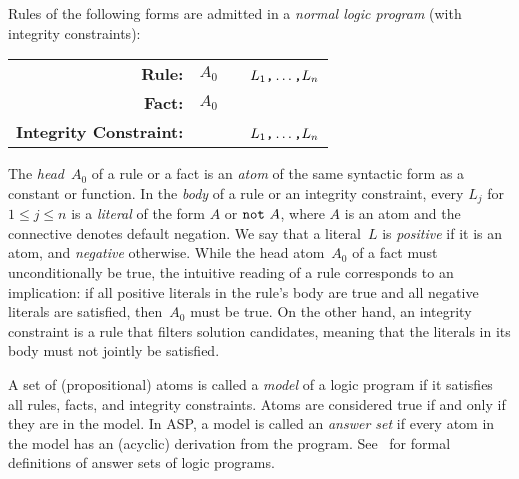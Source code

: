 Rules of the following forms are admitted in a
\emph{normal logic program} (with integrity constraints):
\par
\medskip
\begin{tabular}{rl@{}l}\label{eq:normal:rule}
\textbf{Rule:} & $A_0$&~\code{:-}~$L_1\text{\texttt{,}}\dots\text{\texttt{,}}L_n$\code{.}
\\
\textbf{Fact:} & $A_0$&\code{.}
\\
\textbf{Integrity Constraint:} & &~\code{:-}~$L_1\texttt{,}\dots\texttt{,}L_n$\code{.}
\end{tabular}
%
%
%
\par
\medskip
\noindent
The \emph{head}~$A_0$ of a rule or a fact is an \emph{atom} of the same
syntactic form as a constant or function.
%
In the \emph{body} of a rule or an integrity constraint,
every $L_j$ for $1\leq j\leq n$ is a \emph{literal} of the form $A$ or $\texttt{not}~A$,
where $A$ is an atom and
the connective  denotes default negation.
%
%
We say that a literal~$L$ is \emph{positive} if it is an atom,
and \emph{negative} otherwise.
While the head atom~$A_0$ of a fact must unconditionally be true,
the intuitive reading of a rule corresponds to an implication:
if all positive literals in the rule's body are true and all negative
literals are satisfied, then~$A_0$ must be true.
On the other hand, an integrity constraint is a rule that filters solution candidates,
meaning that the literals in its body must not jointly be satisfied.

A set of (propositional) atoms is called a \emph{model} of a logic program if it satisfies all rules, facts, and integrity constraints.
Atoms are considered true if and only if they are in the model.
In ASP, a model is called an \emph{answer set} if every atom in the model has an (acyclic) derivation from the program.
%
See~\cite{gellif88b,gelfond08a,lifschitz08a} for formal definitions of answer sets of logic programs.

